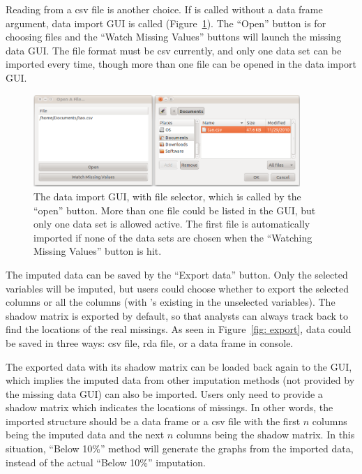 \documentclass[article]{jss}
\begin{document}
Reading from a csv file is another choice.  If  is called without a data frame argument, data import GUI is called (Figure~\ref{fig: import}). The ``Open'' button is for choosing files and the ``Watch Missing Values'' buttons will launch the missing data GUI. The file format must be csv currently, and only one data set can be imported every time, though more than one file can be opened in the data import GUI.

\begin{center}
\begin{figure}[h]
\begin{centering}
\includegraphics[width=0.9\textwidth]{graph/fig6-open}
\par\end{centering}
\caption{The data import GUI, with file selector, which is called by the ``open'' button. More than one file could be listed in the GUI, but only one data set is allowed active. The first file is automatically imported if none of the data sets are chosen when the ``Watching Missing Values'' button is hit.}
\label{fig: import}
\end{figure}
\par\end{center}

The imputed data can be saved by the ``Export data'' button. Only the selected variables will be imputed, but users could choose whether to export the selected columns or all the columns (with 's existing in the unselected variables). The shadow matrix is exported by default, so that analysts can always track back to find the locations of the real missings. As seen in Figure~\ref{fig: export}, data could be saved in three ways: csv file, rda file, or a data frame in  console.

The exported data with its shadow matrix can be loaded back again to the GUI, which implies the imputed data from other imputation methods (not provided by the missing data GUI) can also be imported. Users only need to provide a shadow matrix which indicates the locations of missings. In other words, the imported structure should be a data frame or a csv file with the first $n$ columns being the imputed data and the next $n$ columns being the shadow matrix. In this situation, ``Below 10\%'' method will generate the graphs from the imported data, instead of the actual ``Below 10\%'' imputation.
\end{document}
